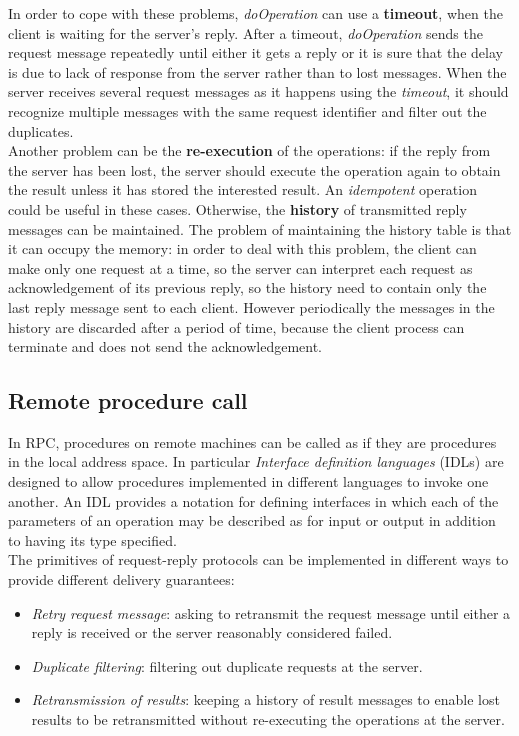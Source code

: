 \documentclass[11pt,a4paper]{article}
\begin{document}
In order to cope with these problems, \textit{doOperation} can use a \textbf{timeout}, when the client is waiting for the server's reply. After a timeout, \textit{doOperation} sends the request message repeatedly until either it gets a reply or it is sure that the delay is due to lack of response from the server rather than to lost messages. When the server receives several request messages as it happens using the \textit{timeout}, it should recognize multiple messages with the same request identifier and filter out the duplicates.\\

Another problem can be the \textbf{re-execution} of the operations: if the reply from the server has been lost, the server should execute the operation again to obtain the result unless it has stored the interested result. An \textit{idempotent} operation could be useful in these cases. Otherwise, the \textbf{history} of transmitted reply messages can be maintained. The problem of maintaining the history table is that it can occupy the memory: in order to deal with this problem, the client can make only one request at a time, so the server can interpret each request as acknowledgement of its previous reply, so the history need to contain only the last reply message sent to each client. However periodically the messages in the history are discarded after a period of time, because the client process can terminate and does not send the acknowledgement.

\subsection{Remote procedure call}
In RPC, procedures on remote machines can be called as if they are procedures in the local address space. In particular \textit{Interface definition languages} (IDLs) are designed to allow procedures implemented in different languages to invoke one another. An IDL provides a notation for defining interfaces in which each of the parameters of an operation may be described as for input or output in addition to having its type specified.\\

The primitives of request-reply protocols can be implemented in different ways to provide different delivery guarantees:
\begin{itemize}
	\item \textit{Retry request message}: asking to retransmit the request message until either a reply is received or the server reasonably considered failed.
	\item \textit{Duplicate filtering}: filtering out duplicate requests at the server.
	\item \textit{Retransmission of results}: keeping a history of result messages to enable lost results to be retransmitted without re-executing the operations at the server.
\end{itemize}
\end{document}
